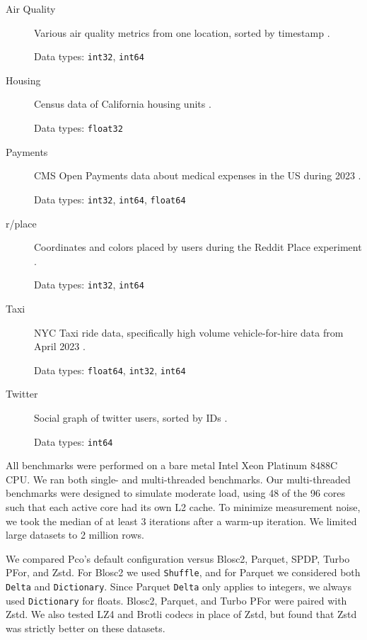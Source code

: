 \documentclass[letterpaper]{article}
\begin{document}
\begin{description}
    \item[Air Quality] Various air quality metrics from one location, sorted by timestamp \cite{air_quality}.
    
    Data types: \texttt{int32}, \texttt{int64}
    
    \item[Housing] Census data of California housing units \cite{housing}.
    
    Data types: \texttt{float32}
    
    \item[Payments] CMS Open Payments data about medical expenses in the US during 2023 \cite{payments}.
    
    Data types: \texttt{int32}, \texttt{int64}, \texttt{float64}
    
    \item[r/place] Coordinates and colors placed by users during the Reddit Place experiment \cite{r_place}.
    
    Data types: \texttt{int32}, \texttt{int64}
    
    \item[Taxi] NYC Taxi ride data, specifically high volume vehicle-for-hire data from April 2023 \cite{taxi}.
    
    Data types: \texttt{float64}, \texttt{int32}, \texttt{int64}
    
    \item[Twitter] Social graph of twitter users, sorted by IDs \cite{twitter}.
    
    Data types: \texttt{int64}
\end{description}

All benchmarks were performed on a bare metal Intel Xeon Platinum 8488C CPU.
We ran both single- and multi-threaded benchmarks. Our multi-threaded benchmarks were designed to simulate moderate load, using 48 of the 96 cores such that each active core had its own L2 cache.
To minimize measurement noise, we took the median of at least 3 iterations after a warm-up iteration.
We limited large datasets to 2 million rows.

We compared Pco's default configuration versus Blosc2, Parquet, SPDP, Turbo PFor, and Zstd.
For Blosc2 we used \texttt{Shuffle}, and for Parquet we considered both \texttt{Delta} and \texttt{Dictionary}.
Since Parquet \texttt{Delta} only applies to integers, we always used \texttt{Dictionary} for floats.
Blosc2, Parquet, and Turbo PFor were paired with Zstd.
We also tested LZ4 and Brotli codecs in place of Zstd, but found that Zstd was strictly better on these datasets.
\end{document}
